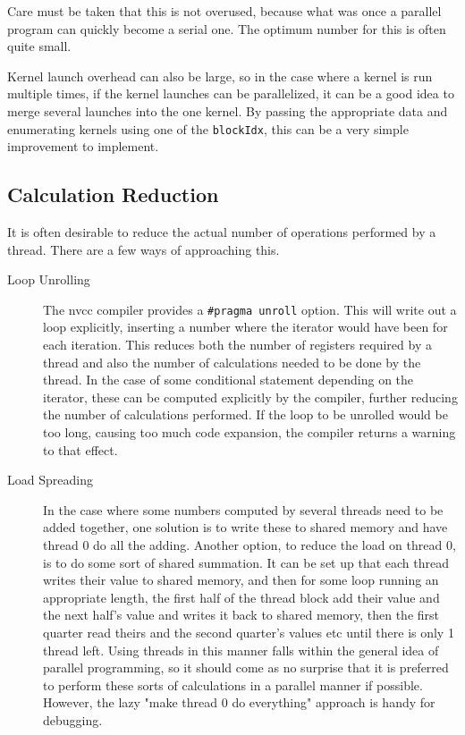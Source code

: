 \documentclass[a4paper,12pt]{report}
\begin{document}
Care must be taken that this is not overused, because what was once a parallel program can quickly become a serial one.
The optimum number for this is often quite small.

Kernel launch overhead can also be large\cite[p~187]{ KirkAndHwu}, so in the case where a kernel is run multiple times, if the kernel launches can be parallelized, it can be a good idea to merge several launches into the one kernel.
By passing the appropriate data and enumerating kernels using one of the \verb!blockIdx!, this can be a very simple improvement to implement.


\subsection{Calculation Reduction}
It is often desirable to reduce the actual number of operations performed by a thread.
There are a few ways of approaching this.

\begin{description}
\item[Loop Unrolling] The nvcc compiler provides a \verb!#pragma unroll! option\cite[p~95]{ CUDA_C_Programming_Guide}.
This will write out a loop explicitly, inserting a number where the iterator would have been for each iteration.
This reduces both the number of registers required by a thread and also the number of calculations needed to be done by the thread.
In the case of some conditional statement depending on the iterator, these can be computed explicitly by the compiler, further reducing the number of calculations performed.
If the loop to be unrolled would be too long, causing too much code expansion, the compiler returns a warning to that effect.

\item[Load Spreading] In the case where some numbers computed by several threads need to be added together, one solution is to write these to shared memory and have thread 0 do all the adding.
Another option, to reduce the load on thread 0, is to do some sort of shared summation.
It can be set up that each thread writes their value to shared memory, and then for some loop running an appropriate length, the first half of the thread block add their value and the next half's value and writes it back to shared memory, then the first quarter read theirs and the second quarter's values etc until there is only 1 thread left.
Using threads in this manner falls within the general idea of parallel programming, so it should come as no surprise that it is preferred to perform these sorts of calculations in a parallel manner if possible.
However, the lazy "make thread 0 do everything" approach is handy for debugging.
\end{description}
\end{document}
